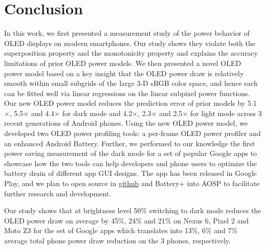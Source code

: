\section{Conclusion}
\label{sec:conc}

In this work, we first presented a measurement study of the power behavior
of OLED displays on modern smartphones.
Our study shows they violate both the
superposition property and the monotonicity property and explains the
accuracy limitations of prior OLED power models. We then presented a
novel OLED power model based on a key
insight that the OLED power draw is relatively smooth within small
subgrids of the large 3-D sRGB color space, and hence each can be fitted
well via linear regressions on the linear subpixel power functions.
Our new OLED power model reduces the prediction error of prior models
by
    5.1$\times$, 5.5$\times$ and 4.4$\times$ for dark mode
    and 4.2$\times$, 2.3$\times$ and 2.5$\times$ for light mode
across 3 recent generations of Android phones.
Using the new OLED power model, we developed two OLED power
profiling tools: a per-frame OLED power profiler and an enhanced Android Battery.
%
Further, we performed to our knowledge the first power saving
measurement of the  dark mode for a set of popular Google
apps to showcase how the two tools can help developers
and phone users to optimize the battery drain of
different app GUI designs.
The \appwithlink app
has been released in Google Play, and
we
plan to open source \name in \url{github} and Battery+ into AOSP
to facilitate further research and development.



Our study shows that at brightness level 50\%
switching to dark mode reduces the OLED
power draw on average by 45\%, 24\% and 21\% on Nexus 6,
Pixel 2 and Moto Z3 for the set of
Google apps which translates into 13\%, 6\% and 7\%
average total phone power draw reduction on the 3 phones, respectively.
\fi
